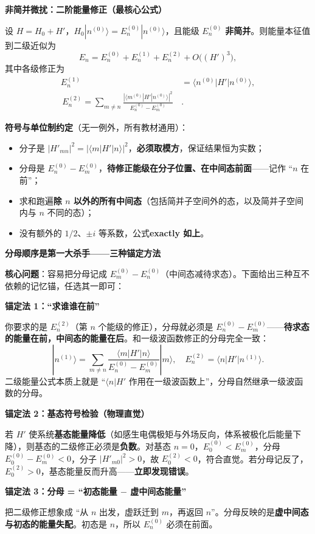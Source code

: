 \begin{formulabox}
\textbf{非简并微扰：二阶能量修正（最核心公式）}

设 $H = H_0 + H'$，$H_0|n^{(0)}\rangle = E_n^{(0)}|n^{(0)}\rangle$，且能级 $E_n^{(0)}$ \textbf{非简并}。则能量本征值到二级近似为
\[
E_n = E_n^{(0)} + E_n^{(1)} + E_n^{(2)} + O\bigl((H')^3\bigr),
\]
其中各级修正为
\begin{align*}
E_n^{(1)} &= \langle n^{(0)}|H'|n^{(0)}\rangle, \\
\boxed{\,E_n^{(2)} = \sum_{m\neq n} \frac{|\langle m^{(0)}|H'|n^{(0)}\rangle|^2}{E_n^{(0)} - E_m^{(0)}}\,}&.
\end{align*}

\textbf{符号与单位制约定}（无一例外，所有教材通用）：
\begin{itemize}
    \item 分子是 $\displaystyle |H'_{mn}|^2 = |\langle m|H'|n\rangle|^2$，\textbf{必须取模方}，保证结果恒为实数；
    \item 分母是 $\displaystyle E_n^{(0)} - E_m^{(0)}$，\textbf{待修正能级在分子位置、在中间态前面}——记作 ``$n$ 在前''；
    \item 求和跑遍\textbf{除 $n$ 以外的所有中间态}（包括简并子空间外的态，以及简并子空间内与 $n$ 不同的态）；
    \item 没有额外的 $1/2$、$\pm i$ 等系数，公式\textbf{exactly 如上}。
\end{itemize}
\end{formulabox}

\begin{thinkbox}[分母顺序记忆锚]
\textbf{分母顺序是第一大杀手——三种锚定方法}

\textbf{核心问题}：容易把分母记成 $E_m^{(0)} - E_n^{(0)}$（中间态减待求态）。下面给出三种互不依赖的记忆锚，任选其一即可：

\textbf{锚定法 1：``求谁谁在前''}

你要求的是 $E_n^{(2)}$（第 $n$ 个能级的修正），分母就必须是 $E_n^{(0)} - E_m^{(0)}$——\textbf{待求态的能量在前，中间态的能量在后}。和一级波函数修正的分母完全一致：
\[
|n^{(1)}\rangle = \sum_{m\neq n}\frac{\langle m|H'|n\rangle}{E_n^{(0)}-E_m^{(0)}}|m\rangle,
\quad
E_n^{(2)} = \langle n|H'|n^{(1)}\rangle.
\]
二级能量公式本质上就是 ``$\langle n|H'$ 作用在一级波函数上''，分母自然继承一级波函数的分母。

\textbf{锚定法 2：基态符号检验（物理直觉）}

若 $H'$ 使系统\textbf{基态能量降低}（如感生电偶极矩与外场反向，体系被极化后能量下降），则基态的二级修正必须是\textbf{负数}。对基态 $n=0$，$E_0^{(0)} < E_m^{(0)}$，分母 $E_0^{(0)}-E_m^{(0)}<0$，分子 $|H'_{m0}|^2>0$，故 $E_0^{(2)}<0$，符合直觉。若分母记反了，$E_0^{(2)}>0$，基态能量反而升高——\textbf{立即发现错误}。

\textbf{锚定法 3：分母 = ``初态能量 $-$ 虚中间态能量''}

把二级修正想象成 ``从 $n$ 出发，虚跃迁到 $m$，再返回 $n$''。分母反映的是\textbf{虚中间态与初态的能量失配}。初态是 $n$，所以 $E_n^{(0)}$ 必须在前面。
\end{thinkbox}

